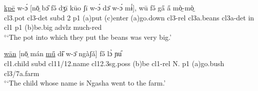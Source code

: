 \documentclass[10pt,twoside]{article}
\def\ci#1{{\ipaFont #1}}
\newcommand{\gl}[1]{`#1'}
\def\VSP{\vspace{0pt}}
\newcommand{\cl}[1]{{\sc cl#1}}
\def\elicited{$^\diamond$}
\newcommand{\comment}[1]{\textcolor{blue}{\emph{#1}}}
\begin{document}
\begin{exe}
	\ex \label{exThePotIntoWhich}	
		\gll \uline{kpē} w-ɔ́ [nō̤ bɔ̋ fə̋ dʒī kūo ʃī w-ɔ́ dɔ̄ w-ɔ́ mɨ́], wū fə̋ ga̋ a̋ mò̤-mò̤	\\
		\cl3.pot \cl3-{\sc det} {\sc subd} 2  {\sc p1} ({\sc a})put ({\sc c})enter ({\sc a})go.down \cl3-{\sc rel} \cl3a.beans \cl3a-{\sc det} in \cl1  {\sc p1} ({\sc b})be.big {\sc advlz} much-{\sc red} 	\\
		\glt \VSP \elicited \gl{The pot into which they put the beans was very big.}
\end{exe}%
%

\begin{exe} 
	\ex \label{exChildWhoseName}	

		\gll	\uline{wān} [nō̤ mán \uline{mű} dɨ̋ w-ɔ̄ ngàʃǎ] fə̋ lɔ̀ ɲu᷇				\\
			\cl1.child {\sc subd} \cl11/12.name \cl12.{\sc 3sg.poss} ({\sc b})be \cl1-{\sc rel} N. {\sc p1} ({\sc a})go.bush \cl3/7a.farm		\\
		\glt \VSP \elicited \gl{The child whose name is Ngasha went to the farm.}
	
\end{exe}%
%
%
%
%
\end{document}
